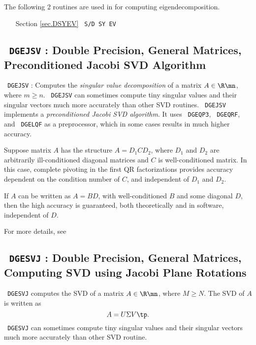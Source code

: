 \documentclass{article}
\renewcommand{\emph}[1]{\textit{\color{purple} #1}}
\newcommand{\code}[1]{\texttt{\color{green!30!black} #1}}
\begin{document}
The following 2 routines are used in \cite{gms22} for computing
eigendecomposition. 
\begin{itemize}[nosep]
    \item[Section \ref{sec.DSYEV}] \code{S/D SY EV}
\end{itemize}

\subsection[\code{DGEJSV}]{\code{DGEJSV} : Double Precision, General
Matrices, Preconditioned Jacobi SVD Algorithm}
\label{sec.DGEJSV}
\code{DGEJSV} : Computes the \emph{singular value
decomposition} of a matrix $A \in \R\mn$, where $m \ge n$.
\code{DGEJSV} can sometimes compute tiny singular values and their
singular vectors much more accurately than other SVD routines.
\code{DGEJSV} implements a \emph{preconditioned Jacobi SVD
algorithm}. It uses \code{DGEQP3}, \code{DGEQRF}, and \code{DGELQF}
as a preprocessor, which in some cases results in much higher
accuracy.  

\begin{example}
    Suppose matrix $A$ has the structure $A = D_1CD_2$, where $D_1$ and
    $D_2$ are arbitrarily ill-conditioned diagonal matrices and $C$ is
    well-conditioned matrix. In this case, complete pivoting in the
    first QR factorizations provides accuracy dependent on the condition
    number of $C$, and independent of $D_1$ and $D_2$. 
\end{example}

\begin{example}
    If $A$ can be written as $A = BD$, with well-conditioned $B$ and
    some diagonal $D$, then the high accuracy is guaranteed, both
    theoretically and in software, independent of $D$. 
\end{example}
For more details, see \cite{drve08i,drve08ii}

\subsection[\code{DGESVJ}]{\code{DGESVJ} : Double Precision, General
Matrices, Computing SVD using Jacobi Plane Rotations}
\label{sec.DGESVJ}
\code{DGESVJ} computes the SVD of a matrix $A \in \R\mn$, where $M \ge
N$. The SVD of $A$ is written as 
\begin{equation}\notag
    A = U \Sigma V \tp.
\end{equation}
\code{DGESVJ} can sometimes compute tiny singular values and their
singular vectors much more accurately than other SVD routine. 
\end{document}
